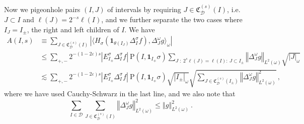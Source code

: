 \documentclass{amsart}%
\theoremstyle{plain}
\numberwithin{equation}{section}
\begin{document}
Now we pigeonhole pairs $\left(  I,J\right)  $ of intervals by requiring
$J\in\mathfrak{C}_{\mathcal{D}}^{\left(  s\right)  }\left(  I\right)  $, i.e.
$J\subset I$ and $\ell\left(  J\right)  =2^{-s}\ell\left(  I\right)  $, and we
further separate the two cases where $I_{J}=I_{\pm}$, the right and left
children of $I$. We have
\begin{align*}
A(I,s) &  \equiv\sum_{J\in\mathfrak{C}_{\mathcal{D}}^{\left(  s\right)
}\left(  I\right)  }\left\vert \langle H_{\sigma}\left(  \mathbf{1}%
_{\theta\left(  I_{J}\right)  }\Delta_{I}^{\sigma}f\right)  ,\Delta
_{J}^{\omega}g\rangle_{\omega}\right\vert \\
&  \leq\sum_{+,-}2^{-\left(  1-2\varepsilon\right)  s}|E_{I_{\mp}}^{\sigma
}\Delta_{I}^{\sigma}f|\ \mathrm{P}(I,\mathbf{1}_{I_{\mp}}\sigma)\sum
_{J\;:\;2^{s}\ell\left(  J\right)  =\ell\left(  I\right)  :\ J\subset I_{\pm}%
}\left\Vert \Delta_{J}^{\omega}g\right\Vert _{L^{2}\left(  \omega\right)
}\sqrt{\left\vert J\right\vert _{\omega}}\\
&  \lesssim\sum_{+,-}2^{-\left(  1-2\varepsilon\right)  s}|E_{I_{\mp}}%
^{\sigma}\Delta_{I}^{\sigma}f|\ \mathrm{P}(I,\mathbf{1}_{I_{\mp}}\sigma
)\sqrt{\left\vert I_{\pm}\right\vert _{\omega}}\sqrt{\sum_{J\in\mathfrak{C}%
_{\mathcal{D}}^{\left(  s\right)  }\left(  I_{\pm}\right)  }\left\Vert
\Delta_{J}^{\omega}g\right\Vert _{L^{2}\left(  \omega\right)  }^{2}}\,,
\end{align*}
where we have used Cauchy-Schwarz in the last line, and we also note that
\begin{equation}
\sum_{I\in\mathcal{D}}\sum_{J\in\mathfrak{C}_{\mathcal{D}}^{\left(  s\right)
}\left(  I\right)  }\left\Vert \Delta_{J}^{\omega}g\right\Vert _{L^{2}\left(
\omega\right)  }^{2}\leq\left\Vert g\right\Vert _{L^{2}(\omega)}%
^{2}\ .\label{g}%
\end{equation}
\end{document}
